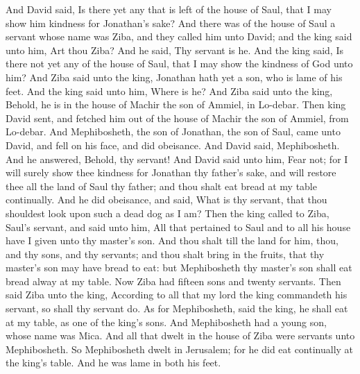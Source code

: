 And David said, Is there yet any that is left of the house of Saul, that I may show him kindness for Jonathan’s sake? And there was of the house of Saul a servant whose name was Ziba, and they called him unto David; and the king said unto him, Art thou Ziba? And he said, Thy servant is he. And the king said, Is there not yet any of the house of Saul, that I may show the kindness of God unto him? And Ziba said unto the king, Jonathan hath yet a son, who is lame of his feet. And the king said unto him, Where is he? And Ziba said unto the king, Behold, he is in the house of Machir the son of Ammiel, in Lo-debar. Then king David sent, and fetched him out of the house of Machir the son of Ammiel, from Lo-debar. And Mephibosheth, the son of Jonathan, the son of Saul, came unto David, and fell on his face, and did obeisance. And David said, Mephibosheth. And he answered, Behold, thy servant! And David said unto him, Fear not; for I will surely show thee kindness for Jonathan thy father’s sake, and will restore thee all the land of Saul thy father; and thou shalt eat bread at my table continually. And he did obeisance, and said, What is thy servant, that thou shouldest look upon such a dead dog as I am?  Then the king called to Ziba, Saul’s servant, and said unto him, All that pertained to Saul and to all his house have I given unto thy master’s son. And thou shalt till the land for him, thou, and thy sons, and thy servants; and thou shalt bring in the fruits, that thy master’s son may have bread to eat: but Mephibosheth thy master’s son shall eat bread alway at my table. Now Ziba had fifteen sons and twenty servants. Then said Ziba unto the king, According to all that my lord the king commandeth his servant, so shall thy servant do. As for Mephibosheth, said the king, he shall eat at my table, as one of the king’s sons. And Mephibosheth had a young son, whose name was Mica. And all that dwelt in the house of Ziba were servants unto Mephibosheth. So Mephibosheth dwelt in Jerusalem; for he did eat continually at the king’s table. And he was lame in both his feet. 


